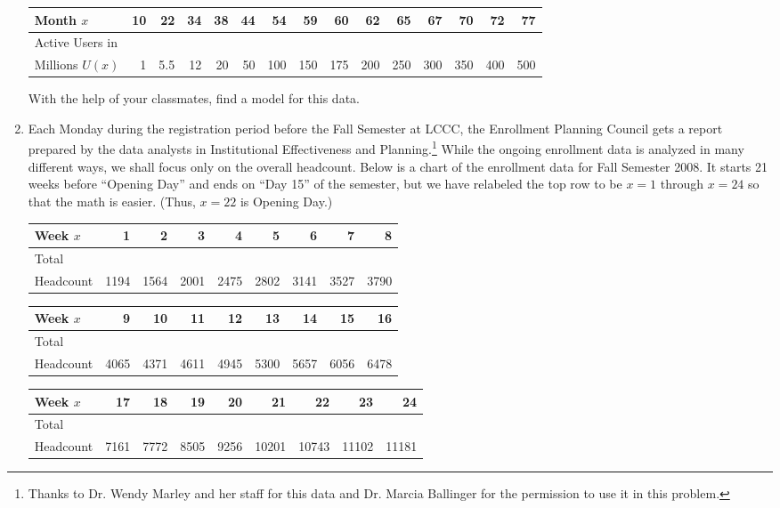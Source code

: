 \begin{enumerate}
\medskip
\small
\noindent \begin{tabular}{|l|r|r|r|r|r|r|r|r|r|r|r|r|r|r|} \hline
Month $x$ & 10 & 22 & 34 & 38 & 44 & 54 & 59 & 60 & 62 & 65 & 67 & 70 & 72 & 77 \\ \hline 
Active Users in & & & & & & & & & & & & & & \\
Millions $U(x)$ & 1 & 5.5 & 12 & 20 & 50 & 100 & 150 & 175 & 200 & 250 & 300 & 350 & 400 & 500\\ \hline
\end{tabular}
\normalsize
\medskip

  With the help of your classmates, find a model for this data.


\item Each Monday during the registration period before the Fall Semester at LCCC, the Enrollment Planning Council gets a report prepared by the data analysts in Institutional Effectiveness and Planning.\footnote{Thanks to Dr. Wendy Marley and her staff for this data and Dr. Marcia Ballinger for the permission to use it  in this problem.}  While the ongoing enrollment data is analyzed in many different ways, we shall focus only on the overall headcount.  Below is a chart of the enrollment data for Fall Semester 2008.  It starts 21 weeks before ``Opening Day'' and ends on ``Day 15'' of the semester, but we have relabeled the top row to be $x = 1$ through $x = 24$ so that the math is easier.  (Thus, $x = 22$ is Opening Day.)


\noindent \begin{tabular}{|l|r|r|r|r|r|r|r|r|} \hline
Week $x$ & 1 & 2 & 3 & 4 & 5 & 6 & 7 & 8 \\ \hline 
Total  & & & & & & & & \\
Headcount & 1194 & 1564 & 2001 & 2475 & 2802 & 3141 & 3527 & 3790 \\ \hline
\end{tabular}

\medskip

\noindent \begin{tabular}{|l|r|r|r|r|r|r|r|r|} \hline
Week $x$ & 9 & 10 & 11 & 12 & 13 & 14 & 15 & 16 \\ \hline 
Total  & & & & & & & & \\
Headcount & 4065 & 4371 & 4611 & 4945 & 5300 & 5657 & 6056 & 6478 \\ \hline
\end{tabular}

\medskip

\noindent \begin{tabular}{|l|r|r|r|r|r|r|r|r|} \hline
Week $x$ & 17 & 18 & 19 & 20 & 21 & 22 & 23 & 24\\ \hline 
Total  & & & & & & & & \\
Headcount & 7161 & 7772 & 8505 & 9256 & 10201 & 10743 & 11102 & 11181 \\ \hline
\end{tabular}


\end{enumerate}
